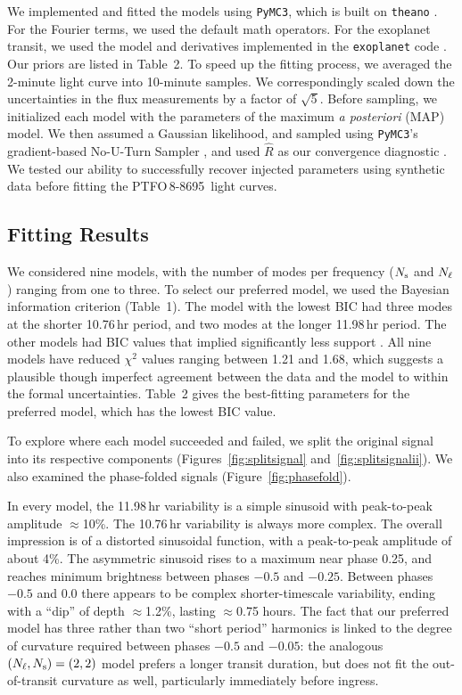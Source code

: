 \documentclass[12pt,twocolumn,tighten,trackchanges]{aastex62}
\newcommand{\ptfo}{PTFO$\,$8-8695}
\begin{document}
We implemented and fitted the models using \texttt{PyMC3}, which is
built on \texttt{theano}
\citep{salvatier_2016_PyMC3,exoplanet:theano}.  For the Fourier terms,
we used the default math operators.  For the exoplanet transit, we
used the model and derivatives implemented in the \texttt{exoplanet}
code \citep{exoplanet:exoplanet}.  Our priors are listed in Table~2.
To speed up the fitting process, we averaged the 2-minute light curve
into 10-minute samples.  We correspondingly scaled down the
uncertainties in the flux measurements by a factor of $\sqrt{5}$.
Before sampling, we initialized each model with the parameters of the
maximum {\it a posteriori} (MAP) model.  We then assumed a Gaussian
likelihood, and sampled using \texttt{PyMC3}'s gradient-based
No-U-Turn Sampler \citep{hoffman_no-u-turn_2014}, and used $\hat{R}$
as our convergence diagnostic \citep{gelman_inference_1992}.  We
tested our ability to successfully recover injected parameters using
synthetic data before fitting the \ptfo\ light curves.


\subsection{Fitting Results}

We considered nine models, with the number of modes per frequency
($N_{\rm s}$ and $N_{\rm \ell}$) ranging from one to three.  To select
our preferred model, we used the Bayesian information criterion
(Table~1).  The model with the lowest BIC had three modes at the
shorter 10.76$\,$hr period, and two modes at the longer 11.98$\,$hr
period.  The other models had BIC values that implied significantly
less support \citep{burnham_multimodel_2016}.  All nine models have
reduced $\chi^2$ values ranging between 1.21 and 1.68, which suggests
a plausible though imperfect agreement between the data and the model
to within the formal uncertainties.  Table~2 gives the best-fitting
parameters for the preferred model, which has the lowest BIC value.

To explore where each model succeeded and failed, we split the
original signal into its respective components
(Figures~\ref{fig:splitsignal} and~\ref{fig:splitsignalii}).  We also
examined the phase-folded signals (Figure~\ref{fig:phasefold}).  

In every model, the 11.98$\,$hr variability is a simple sinusoid with
peak-to-peak amplitude $\approx$10\%.  The 10.76$\,$hr variability is
always more complex.  The overall impression is of a distorted
sinusoidal function, with a peak-to-peak amplitude of about 4\%.  The
asymmetric sinusoid rises to a maximum near phase 0.25, and reaches
minimum brightness between phases $-0.5$ and $-0.25$.  Between phases
$-0.5$ and $0.0$ there appears to be complex shorter-timescale
variability, ending with a ``dip'' of depth $\approx$1.2\%, lasting
$\approx$0.75 hours.  The fact that our preferred model has three
rather than two ``short period'' harmonics is linked to the degree of
curvature required between phases $-0.5$ and $-0.05$: the analogous
$(N_{\rm \ell},N_{\rm s})=(2,2)$ model prefers a longer transit
duration, but does not fit the out-of-transit curvature as well,
particularly immediately before ingress.
\end{document}
